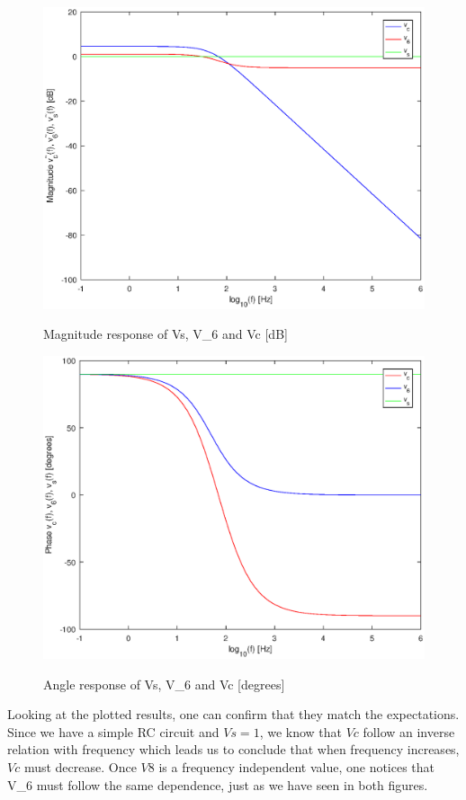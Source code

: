 \begin{figure}[!ht] \centering
 \caption{Magnitude response of Vs, V_{6} and Vc [dB]}
 \includegraphics[width=0.8\linewidth]{magnitude.eps}
 \label{fig:g6_1}
\end{figure}

\begin{figure}[!ht] \centering
 \caption{Angle response of Vs, V_{6} and Vc [degrees]}
 \includegraphics[width=0.8\linewidth]{phase.eps}
 \label{fig:g6_2}
\end{figure}

\par Looking at the plotted results, one can confirm that they match the expectations. Since we have a simple RC circuit and $Vs = 1$, we know that $Vc$ follow an inverse relation with frequency which leads us to conclude that when frequency increases, $Vc$ must decrease. Once $V8$ is a frequency independent value, one notices that V_{6} must follow the same dependence, just as we have seen in both figures.

